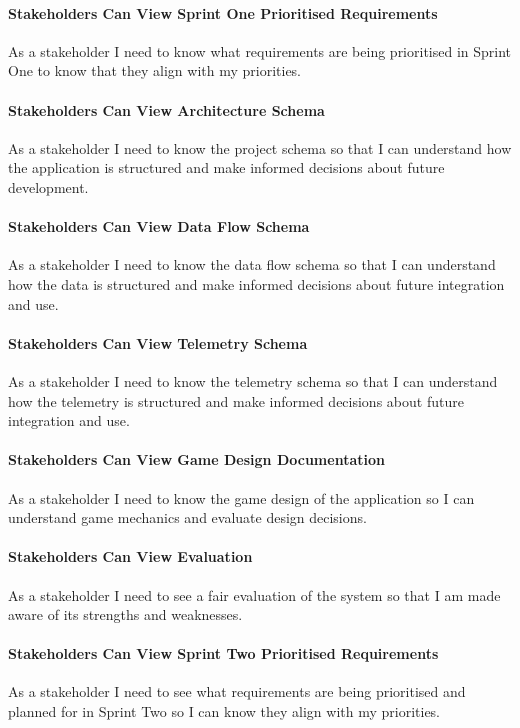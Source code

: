 \paragraph{Stakeholders Can View Sprint One Prioritised Requirements}
As a stakeholder I need to know what requirements are being prioritised in Sprint One to know that they align with my priorities.

\paragraph{Stakeholders Can View Architecture Schema}
As a stakeholder I need to know the project schema so that I can understand how the application is structured and make informed decisions about future development.

\paragraph{Stakeholders Can View Data Flow Schema}
As a stakeholder I need to know the data flow schema so that I can understand how the data is structured and make informed decisions about future integration and use.

\paragraph{Stakeholders Can View Telemetry Schema}
As a stakeholder I need to know the telemetry schema so that I can understand how the telemetry is structured and make informed decisions about future integration and use.

\paragraph{Stakeholders Can View Game Design Documentation}
As a stakeholder I need to know the game design of the application so I can understand game mechanics and evaluate design decisions.

\paragraph{Stakeholders Can View Evaluation}
As a stakeholder I need to see a fair evaluation of the system so that I am made aware of its strengths and weaknesses.

\paragraph{Stakeholders Can View Sprint Two Prioritised Requirements}
As a stakeholder I need to see what requirements are being prioritised and planned for in Sprint Two so I can know they align with my priorities.

